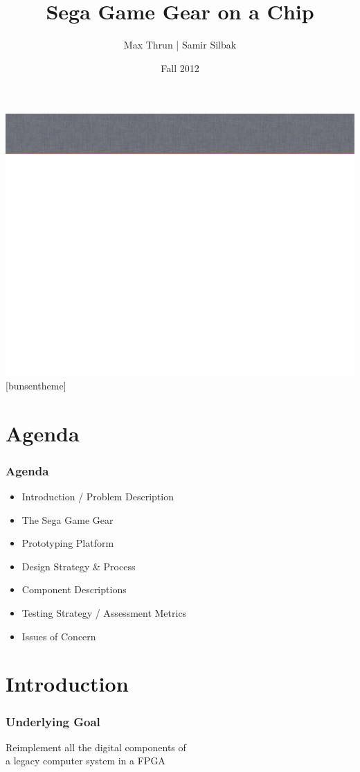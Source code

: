 \documentclass{beamer}
\title{Sega Game Gear on a Chip}
\author{Max Thrun | Samir Silbak}
\institute{University of Cincinnati}
\date{Fall 2012}
\newlength{\wideitemsep}
\let\olditem\item
\renewcommand{\item}{\setlength{\itemsep}{\wideitemsep}\olditem}
\begin{document}
\maketitle

%
%
{\includegraphics[width=\paperwidth,height=\paperheight]{slide_bg.png}}
[bunsentheme]

\section{Agenda}
\begin{frame}
\frametitle{Agenda}
    \begin{itemize}
        \item Introduction / Problem Description
        \item The Sega Game Gear
        \item Prototyping Platform
        \item Design Strategy \& Process
        \item Component Descriptions
        \item Testing Strategy / Assessment Metrics
        \item Issues of Concern
    \end{itemize}
\end{frame}

\section{Introduction}
\begin{frame}
\frametitle{Underlying Goal}
    \begin{center}
        \Large
        Reimplement all the digital components of \\a legacy computer system in a FPGA
    \end{center}
\end{frame}
\end{document}
